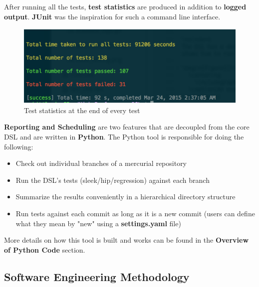 \documentclass[12pt]{article}
\begin{document}
\noindent
After running all the tests, \textbf{test statistics} are produced in addition to \textbf{logged output}. \textbf{JUnit} was the inspiration for such a command line interface.

\begin{figure}[H]
  \centering
    \includegraphics[height=150px]{figures/test_statistics.png}
  \caption{Test statistics at the end of every test}
\end{figure}

\noindent
\textbf{Reporting and Scheduling} are two features that are decoupled from the core DSL and are written in \textbf{Python}. The Python tool is responsible for doing the following:
\begin{itemize}
\item Check out individual branches of a mercurial repository
\item Run the DSL's tests (sleek/hip/regression) against each branch
\item Summarize the results conveniently in a hierarchical directory
structure
\item Run tests against each commit as long as it is a new commit (users can define what they mean by "new" using a \textbf{settings.yaml } file)
\end{itemize}

More details on how this tool is built and works can be found in the \textbf{Overview of Python Code} section.
\bigskip


\newpage
\subsection{Software Engineering Methodology}
\end{document}
